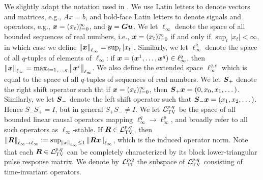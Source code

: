 We slightly adapt the notation used in \cite{khammash1990stability}.  We use Latin letters to denote vectors and matrices, e.g., $Ax = b$, and bold-face Latin letters to denote signals and operators, e.g., $\boldsymbol{x} = (x_t)_{t=0}^\infty$, and $\boldsymbol{y} = \boldsymbol{G} \boldsymbol{u}$.  We let $\ell_\infty$ denote the space of all bounded sequences of real numbers, i.e., $\boldsymbol{x} = (x_t)_{t=0}^\infty$ if and only if $\sup_t |x_t|<\infty$, in which case we define $\left\|\boldsymbol{x}\right\|_{\ell_\infty} = \sup_t |x_t|$.  Similarly, we let $\ell^q_\infty$ denote the space of all $q$-tuples of elements of $\ell_\infty$: if $\boldsymbol{x} = (\boldsymbol{x}^1, \dots, \boldsymbol{x}^q) \in \ell^q_\infty$, then $\left\|\boldsymbol{x}\right\|_{\ell_\infty} = \max_{i=1,\dots, q}\left\|\boldsymbol{x}^i\right\|_{\ell_\infty}$.  We also define the extended space $\ell^{q,e}_\infty$ which is equal to the space of all $q$-tuples of sequences of real numbers.  We let $\boldsymbol{S}_+$ denote the right shift operator such tht if $\boldsymbol{x} = (x_t)_{t=0}^\infty$, then $\boldsymbol{S}_+\boldsymbol{x} = (0,x_0, x_1, \dots)$.  Similarly, we let $\boldsymbol{S}_-$ denote the left shift operator such that $\boldsymbol{S}_- \boldsymbol{x} = (x_1,x_2, \dots)$.  Hence $S_-S_+ = I$, but in general $S_+ S_- \neq I$.  We let $\mathcal{L}_{\mathrm{TV}}^{p,q}$ be the space of all bounded linear causal operators mapping $\ell^q_\infty \to \ell^p_\infty$, and broadly refer to all such operators as $\ell_\infty$-stable.  If $\boldsymbol{R} \in \mathcal{L}_{\mathrm{TV}}^{p,q}$, then $\left\|\boldsymbol{R}\right\|_{\ell_\infty\to\ell_\infty} := \sup_{\left\|x\right\|_{\ell_\infty}\leq 1}\left\|\boldsymbol{R} \boldsymbol{x}\right\|_{\ell_\infty}$, which is the induced operator norm.  Note that each $\boldsymbol{R} \in \mathcal{L}_{\mathrm{TV}}^{p,q}$ can be completely characterized by its block lower-triangular pulse response matrix.  We denote by $\mathcal{L}_{\mathrm{TI}}^{p,q}$ the subspace of $\mathcal{L}_{\mathrm{TV}}^{p,q}$ consisting of time-invariant operators.